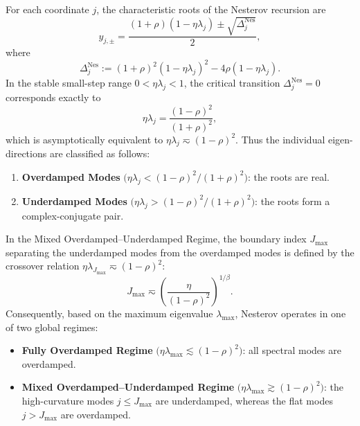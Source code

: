 \begin{proposition}
\label{prop:nes_mode_decomposition}
For each coordinate $j$, the characteristic roots of the Nesterov recursion are
\[
    y_{j,\pm}
    =
    \frac{(1+\rho)(1-\eta\lambda_j)\pm\sqrt{\Delta_j^{\mathrm{Nes}}}}{2},
\]
where
\[
    \Delta_j^{\mathrm{Nes}}
    :=
    (1+\rho)^2(1-\eta\lambda_j)^2
    -4\rho(1-\eta\lambda_j).
\]
In the stable small-step range $0<\eta\lambda_j<1$, the critical transition $\Delta_j^{\mathrm{Nes}}=0$ corresponds exactly to
\[
    \eta\lambda_j
    =
    \frac{(1-\rho)^2}{(1+\rho)^2},
\]
which is asymptotically equivalent to $\eta\lambda_j\eqsim(1-\rho)^2$. Thus the individual eigen-directions are classified as follows:
\begin{enumerate}
    \item \textbf{Overdamped Modes} $\bigl(\eta\lambda_j<(1-\rho)^2/(1+\rho)^2\bigr)$: the roots are real.
    \item \textbf{Underdamped Modes} $\bigl(\eta\lambda_j>(1-\rho)^2/(1+\rho)^2\bigr)$: the roots form a complex-conjugate pair.
\end{enumerate}
In the Mixed Overdamped--Underdamped Regime, the boundary index $J_{\max}$ separating the underdamped modes from the overdamped modes is defined by the crossover relation $\eta\lambda_{J_{\max}}\eqsim(1-\rho)^2$:
\begin{equation}
\label{eq:J_max_nes}
    J_{\max}
    \eqsim
    \left(\frac{\eta}{(1-\rho)^2}\right)^{1/\beta}.
\end{equation}
Consequently, based on the maximum eigenvalue $\lambda_{\max}$, Nesterov operates in one of two global regimes:
\begin{itemize}
    \item \textbf{Fully Overdamped Regime} $\bigl(\eta\lambda_{\max}\lesssim(1-\rho)^2\bigr)$: all spectral modes are overdamped.
    \item \textbf{Mixed Overdamped--Underdamped Regime} $\bigl(\eta\lambda_{\max}\gtrsim(1-\rho)^2\bigr)$: the high-curvature modes $j\le J_{\max}$ are underdamped, whereas the flat modes $j>J_{\max}$ are overdamped.
\end{itemize}
\end{proposition}


